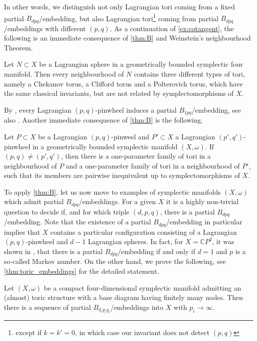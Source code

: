 \documentclass[12pt,a4paper,abstract=true,final]{scrartcl}
\begin{document}
In other words, we distinguish not only Lagrangian tori coming from a fixed partial $B_{dpq}$\-/embedding, but also Lagrangian tori\footnote{except if $k=k'=0$, in which case our invariant does not detect $(p,q)$} coming from partial $B_{dpq}$\-/embeddings with different $(p,q)$.
As a continuation of \cref{ex:cotangent}, the following is an immediate consequence of \cref{thm:B} and Weinstein's neighbourhood Theorem.

\begin{corollary}
    \label{thm:lag_sphere}
    Let $N \subset X$ be a Lagrangian sphere in a geometrically bounded symplectic four manifold.
    Then every neighbourhood of $N$ contains three different types of tori, namely a Chekanov torus, a Clifford torus and a Polterovich torus, which have the same classical invariants, but are not related by symplectomorphisms of $X$.
\end{corollary}

By \cite{Kho13}, every Lagrangian $(p,q)$-pinwheel induces a partial $B_{1pq}$\-/embedding, see also \cite[Definition 2.10]{EvaSmi18}.
Another immediate consequence of \cref{thm:B} is the following.

\begin{corollary}
    \label{thm:pinwheels}
    Let $P \subset X$ be a Lagrangian $(p,q)$-pinweel and $P' \subset X$ a Lagrangian $(p',q')$-pinwheel in a geometrically bounded symplectic manifold $(X,\omega)$.
    If $(p,q) ≠ (p',q')$, then there is a one-parameter family of tori in a neighbourhood of $P$ and a one-parameter family of tori in a neighbourhood of $P'$, such that its members are pairwise inequivalent up to symplectomorphisms of $X$.
\end{corollary}

To apply \cref{thm:B}, let us now move to examples of symplectic manifolds $(X,\omega)$ which admit partial $B_{dpq}$\-/embeddings.
For a given $X$ it is a highly non-trivial question to decide if, and for which triple $(d,p,q)$, there is a partial $B_{dpq}$\-/embedding.
Note that the existence of a partial $B_{dpq}$\-/embedding in particular implies that $X$ contains a particular configuration consisting of a Lagrangian $(p,q)$-pinwheel and $d-1$ Lagrangian spheres.
In fact, for $X = \mathbb{C}P^2$, it was shown in \cite{EvaSmi18}, that there is a partial $B_{dpq}$\-/embedding if and only if $d=1$ and $p$ is a so-called Markov number.
On the other hand, we prove the following, see \cref{thm:toric_embeddings} for the detailed statement.

\begin{proposition}
    \label{thm:intro_stretch}
  Let $(X,\omega)$ be a compact four-dimensional symplectic manifold admitting an (almost) toric structure with a base diagram having finitely many nodes.
Then there is a sequence of partial $B_{d_i p_i q_i}$\-/embeddings into $X$ with $p_i \rightarrow \infty$. 
\end{proposition}
\end{document}
